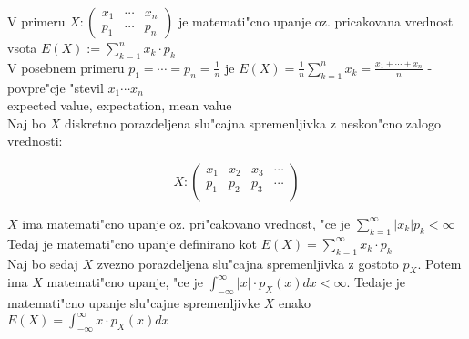 \documentclass[a4paper,12pt]{article}
\theoremstyle{definition}
\theoremstyle{remark}
\begin{document}
V primeru $X : \begin{pmatrix}x_1 & \cdots & x_n \\ p_1 & \cdots & p_n
\end{pmatrix}$ je matemati"cno upanje oz. pricakovana vrednost vsota $E(X) := \sum_{k=1}^{n} x_k \cdot p_k$ \\

V posebnem primeru $p_1 = \cdots = p_n = \frac{1}{n}$ je $E(X) = \frac{1}{n} \sum_{k=1}^{n} x_k =
\frac{x_1 + \cdots + x_n}{n}$ - povpre"cje "stevil $x_1 \cdots x_n$ \\

expected value, expectation, mean value \\

Naj bo $X$ diskretno porazdeljena slu"cajna spremenljivka z neskon"cno zalogo vrednosti:

\begin{equation*}
    X: \begin{pmatrix}
        x_1 & x_2 & x_3 & \cdots \\
        p_1 & p_2 & p_3 & \cdots \\
    \end{pmatrix}
\end{equation*}

$X$ ima matemati"cno upanje oz. pri"cakovano vrednost, "ce je $\sum_{k=1}^{\infty} |x_k| p_k < \infty$ \\
Tedaj je matemati"cno upanje definirano kot $E(X) = \sum_{k=1}^{\infty} x_k \cdot p_k$ \\
Naj bo sedaj $X$ zvezno porazdeljena slu"cajna spremenljivka z gostoto $p_X$. Potem ima $X$ matemati"cno
upanje, "ce je $\int_{-\infty}^{\infty} |x| \cdot p_X(x) dx < \infty$. Tedaje je matemati"cno upanje
slu"cajne spremenljivke $X$ enako $E(X) = \int_{-\infty}^{\infty} x \cdot p_X(x) dx$
\end{document}
